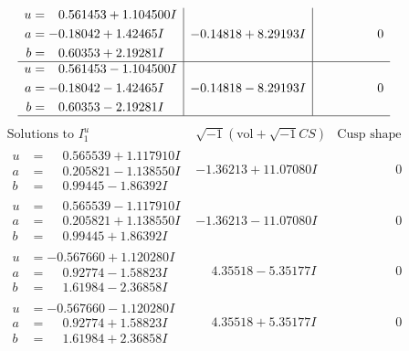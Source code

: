 \documentclass[1p]{elsarticle_modified}
\theoremstyle{definition}
\newcommand{\I}{\sqrt{-1}}
\begin{document}
$$\begin{array}{c|c|c}
\begin{aligned}
u &= \phantom{-}0.561453 + 1.104500 I \\
a &= -0.18042 + 1.42465 I \\
b &= \phantom{-}0.60353 + 2.19281 I\end{aligned}
 & -0.14818 + 8.29193 I & \phantom{-0.000000 } 0 \\ \hline\begin{aligned}
u &= \phantom{-}0.561453 - 1.104500 I \\
a &= -0.18042 - 1.42465 I \\
b &= \phantom{-}0.60353 - 2.19281 I\end{aligned}
 & -0.14818 - 8.29193 I & \phantom{-0.000000 } 0\\
 \hline 
 \end{array}$$\newpage$$\begin{array}{c|c|c}  
\text{Solutions to }I^u_{1}& \I (\text{vol} + \sqrt{-1}CS) & \text{Cusp shape}\\
 \hline 
\begin{aligned}
u &= \phantom{-}0.565539 + 1.117910 I \\
a &= \phantom{-}0.205821 - 1.138550 I \\
b &= \phantom{-}0.99445 - 1.86392 I\end{aligned}
 & -1.36213 + 11.07080 I & \phantom{-0.000000 } 0 \\ \hline\begin{aligned}
u &= \phantom{-}0.565539 - 1.117910 I \\
a &= \phantom{-}0.205821 + 1.138550 I \\
b &= \phantom{-}0.99445 + 1.86392 I\end{aligned}
 & -1.36213 - 11.07080 I & \phantom{-0.000000 } 0 \\ \hline\begin{aligned}
u &= -0.567660 + 1.120280 I \\
a &= \phantom{-}0.92774 - 1.58823 I \\
b &= \phantom{-}1.61984 - 2.36858 I\end{aligned}
 & \phantom{-}4.35518 - 5.35177 I & \phantom{-0.000000 } 0 \\ \hline\begin{aligned}
u &= -0.567660 - 1.120280 I \\
a &= \phantom{-}0.92774 + 1.58823 I \\
b &= \phantom{-}1.61984 + 2.36858 I\end{aligned}
 & \phantom{-}4.35518 + 5.35177 I & \phantom{-0.000000 } 0 \\ \hline\begin{aligned}

\end{aligned}
\end{array}$$
\end{document}
